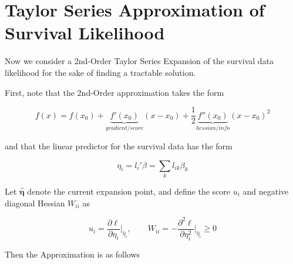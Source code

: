 \documentclass{article}[12pt]
\begin{document}
\section{Taylor Series Approximation of Survival Likelihood}

Now we consider a 2nd-Order Taylor Series Expansion of the survival data likelihood for the sake of finding a tractable solution.

First, note that the 2nd-Order approximation takes the form

\begin{equation}
    f(x) = f(x_0) + \underbrace{f'(x_0)}_{gradient/score}(x-x_0) + \frac{1}{2}\underbrace{f''(x_0)}_{hessian/info}(x-x_0)^2
\end{equation}

and that the linear predictor for the survival data has the form

\begin{equation}
    \eta_i = l_i'\beta = \sum_{k}l_{ik}\beta_{k}
\end{equation}

Let $\hat{\bm{\eta}}$ denote the current expansion point, and define the score
$u_i$ and negative diagonal Hessian $W_{ii}$ as

\begin{equation}
    u_i = \frac{\partial \ell}{\partial \eta_i}\Bigg|_{\hat{\eta}_i}, \qquad
    W_{ii} = -\frac{\partial^2 \ell}{\partial \eta_i^2}\Bigg|_{\hat{\eta}_i} \geq 0
\end{equation}

Then the Approximation is as follows
\end{document}
